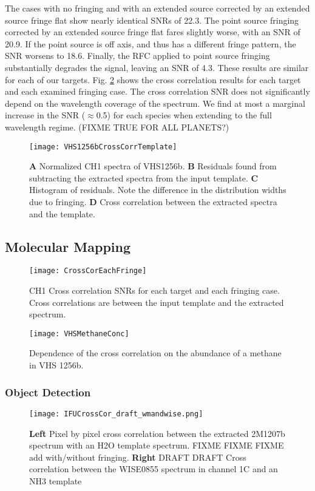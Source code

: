 The cases with no fringing and with an extended source corrected by an extended source fringe flat show nearly identical SNRs of 22.3.
The point source fringing corrected by an extended source fringe flat fares slightly worse, with an SNR of 20.9. 
If the point source is off axis, and thus has a different fringe pattern, the SNR worsens to 18.6.
Finally, the RFC applied to point source fringing substantially degrades the signal, leaving an SNR of 4.3.
These results are similar for each of our targets. 
Fig. \ref{fig:ccall} shows the cross correlation results for each target and each examined fringing case.
The cross correlation SNR does not significantly depend on the wavelength coverage of the spectrum.
We find at most a marginal increase in the SNR ($\approx$0.5) for each species when extending to the full wavelength regime. (FIXME TRUE FOR ALL PLANETS?)
\begin{figure}[h]
	\centering
	\texttt{[image: VHS1256bCrossCorrTemplate]}
	\caption{\textbf{A} Normalized CH1 spectra of VHS1256b. \textbf{B} Residuals found from subtracting the extracted spectra from the input template. \textbf{C} Histogram of residuals. Note the difference in the distribution widths due to fringing. \textbf{D} Cross correlation between the extracted spectra and the template.}
	\label{fig:CrossCor1D}	
\end{figure}
\clearpage

\subsection{Molecular Mapping}
\begin{figure}[t]
	\texttt{[image: CrossCorEachFringe]}
	\caption{CH1 Cross correlation SNRs for each target and each fringing case. Cross correlations are between the input template and the extracted spectrum.}
	\label{fig:ccall}
\end{figure}
\begin{figure}[t]
	\texttt{[image: VHSMethaneConc]}
	\caption{Dependence of the cross correlation on the abundance of a methane in VHS 1256b.}
	\label{fig:vhsmeth}
\end{figure}
\subsubsection{Object Detection}
\begin{figure}[t]
	\centering
	\texttt{[image: IFUCrossCor\_draft\_wmandwise.png]}
	\caption{\textbf{Left} Pixel by pixel cross correlation between the extracted 2M1207b spectrum with an H2O template spectrum. FIXME FIXME FIXME add with/without fringing.
		\textbf{Right} DRAFT DRAFT Cross correlation between the WISE0855 spectrum in channel 1C and an NH3 template}
	\label{fig:h2omap}
\end{figure}
